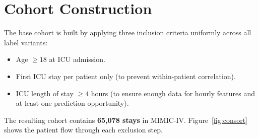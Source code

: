 \section{Cohort Construction}

The base cohort is built by applying three inclusion criteria uniformly across
all label variants:

\begin{itemize}
    \item Age $\geq 18$ at ICU admission.
    \item First ICU stay per patient only (to prevent within-patient correlation).
    \item ICU length of stay $\geq 4$ hours (to ensure enough data for hourly
    features and at least one prediction opportunity).
\end{itemize}

The resulting cohort contains \textbf{65,078 stays} in MIMIC-IV.
Figure~\ref{fig:consort} shows the patient flow through each exclusion step.

